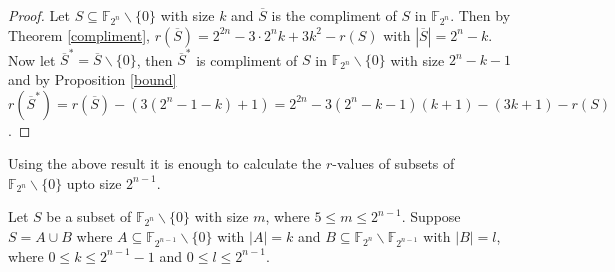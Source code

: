 \documentclass[12pt,a4paper]{article}
\begin{document}
	\begin{proof}
		Let $S\subseteq\mathbb{F}_{2^n}\backslash\{0\}$ with size $k$ and $\overline{S}$ is the compliment of $S$ in $\mathbb{F}_{2^n}$. Then by Theorem \ref{compliment}, $r(\overline{S})=2^{2n}-3\cdot2^nk+3k^2-r(S)$ with $|\overline{S}|=2^n-k$. Now let $\overline{S}^*=\overline{S}\backslash\{0\}$, then $\overline{S}^*$ is compliment of $S$ in $\mathbb{F}_{2^n}\backslash\{0\}$ with size $2^n-k-1$ and by Proposition \ref{bound} $r(\overline{S}^*)=r(\overline{S})-(3(2^n-1-k)+1)=2^{2n}-3(2^n-k-1)(k+1)-(3k+1)-r(S)$.
	\end{proof}
	Using the above result it is enough to calculate the $r$-values of subsets of $\mathbb{F}_{2^n}\backslash\{0\}$ upto size $2^{n-1}$.
	\par Let $S$ be a subset of $\mathbb{F}_{2^n}\backslash\{0\}$ with size $m$, where $5\leq m\leq 2^{n-1}$. Suppose $S=A\cup B$ where $A\subseteq\mathbb{F}_{2^{n-1}}\backslash\{0\}$ with $|A|=k$ and $B\subseteq\mathbb{F}_{2^n}\backslash\mathbb{F}_{2^{n-1}}$ with $|B|=l$, where $0\leq k\leq 2^{n-1}-1 $ and $0\leq l\leq 2^{n-1}$. 
	
\end{document}
